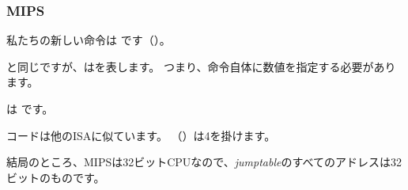 ﻿\subsubsection{MIPS}




私たちの新しい命令は  です（）。

と同じですが、はを表します。
つまり、命令自体に数値を指定する必要があります。

 は です。

コードは他の\ac{ISA}に似ています。
 （）は4を掛けます。

結局のところ、MIPSは32ビットCPUなので、\emph{jumptable}のすべてのアドレスは32ビットのものです。
